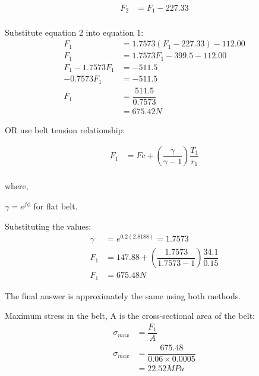 \documentclass[a4paper, fleqn]{article}
\begin{document}
\begin{equation}
    \begin{aligned}
    F_2 &= F_1 - 227.33\\
    \end{aligned}
    \label{eq2}
\end{equation}

Substitute equation 2 into equation 1:
\begin{equation*}
    \begin{aligned}
    F_1 &= 1.7573 (F_1 - 227.33) - 112.00\\
    F_1 &= 1.7573 F_1 - 399.5 - 112.00\\
    F_1 - 1.7573 F_1 &= -511.5\\
    -0.7573 F_1 &= -511.5\\
    F_1 &= \dfrac{511.5}{0.7573}\\
    &= 675.42 N
    \end{aligned}
\end{equation*}

OR use belt tension relationship:

\begin{equation*}
    \begin{aligned}
    F_1 &= Fc+ \left(\dfrac{\gamma}{\gamma-1}\right) \dfrac{T_1}{r_1}\\
    \end{aligned}
\end{equation*}

where,

$\gamma = e^{f \phi}$ for flat belt.

Substituting the values:
\begin{equation*}
    \begin{aligned}
        \gamma &= e^{0.2(2.8188)} = 1.7573\\
        F_1 &= 147.88 + \left(\dfrac{1.7573}{1.7573-1}\right) \dfrac{34.1}{0.15}\\
        F_1 &= 675.48 N
    \end{aligned}
\end{equation*}

The final answer is approximately the same using both methods.

\vspace{10pt}
Maximum stress in the belt, A is the cross-sectional area of the belt:
\begin{equation*}
    \begin{aligned}
    \sigma_{max} &= \dfrac{F_1}{A}\\
    \sigma_{max} &= \dfrac{675.48}{0.06 \times 0.0005}\\
    &= 22.52 MPa
    \end{aligned}
\end{equation*}
\end{document}

